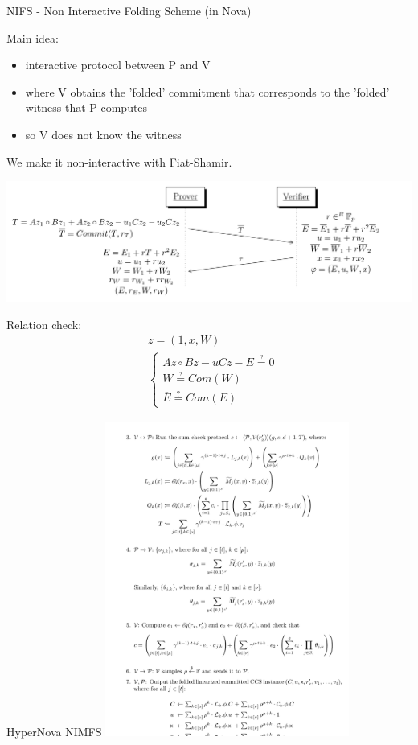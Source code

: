 \documentclass[t]{beamer}
\begin{document}
\begin{frame}{NIFS - Non Interactive Folding Scheme (in Nova)}
  \scriptsize{
  Main idea:
  \begin{itemize}
    \item interactive protocol between P and V
    \item where V obtains the 'folded' commitment that corresponds to the 'folded' witness that P computes
    \item so V does not know the witness
  \end{itemize}
  We make it non-interactive with Fiat-Shamir.
  }

  \includegraphics[width=\textwidth]{./imgs/interactive-FS-nova-diagram}

  Relation check:
  \begin{align*}
    &z=(1,x,W)\\
     &\begin{cases}
    Az \circ Bz - uCz - E \stackrel{?}{=} 0\\
    \overline{W} \stackrel{?}{=} Com(W)\\
    \overline{E} \stackrel{?}{=} Com(E)
  \end{cases}
  \end{align*}
\end{frame}

\begin{frame}{HyperNova NIMFS}
  \includegraphics[width=8cm]{./imgs/hypernova-screenshot}
\end{frame}
\end{document}
